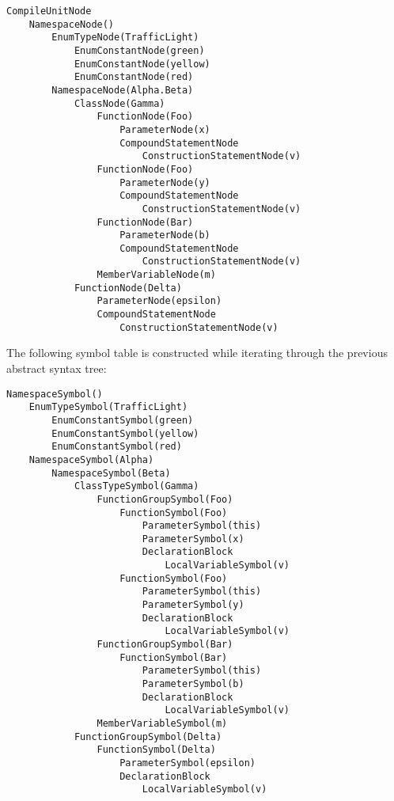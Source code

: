 \documentclass[a4paper,oneside,11pt]{book}
\theoremstyle{definition}
\begin{document}
\begin{verbatim}
CompileUnitNode
    NamespaceNode()
        EnumTypeNode(TrafficLight)
            EnumConstantNode(green)
            EnumConstantNode(yellow)
            EnumConstantNode(red)
        NamespaceNode(Alpha.Beta)
            ClassNode(Gamma)
                FunctionNode(Foo)
                    ParameterNode(x)
                    CompoundStatementNode
                        ConstructionStatementNode(v)
                FunctionNode(Foo)
                    ParameterNode(y)
                    CompoundStatementNode
                        ConstructionStatementNode(v)
                FunctionNode(Bar)
                    ParameterNode(b)
                    CompoundStatementNode
                        ConstructionStatementNode(v)
                MemberVariableNode(m)
            FunctionNode(Delta)
                ParameterNode(epsilon)
                CompoundStatementNode
                    ConstructionStatementNode(v)
\end{verbatim}

\clearpage
The following symbol table is constructed while iterating through the previous abstract syntax tree:

\begin{verbatim}
NamespaceSymbol()
    EnumTypeSymbol(TrafficLight)
        EnumConstantSymbol(green)
        EnumConstantSymbol(yellow)
        EnumConstantSymbol(red)
    NamespaceSymbol(Alpha)
        NamespaceSymbol(Beta)
            ClassTypeSymbol(Gamma)
                FunctionGroupSymbol(Foo)
                    FunctionSymbol(Foo)
                        ParameterSymbol(this)
                        ParameterSymbol(x)
                        DeclarationBlock
                            LocalVariableSymbol(v)
                    FunctionSymbol(Foo)
                        ParameterSymbol(this)
                        ParameterSymbol(y)
                        DeclarationBlock
                            LocalVariableSymbol(v)
                FunctionGroupSymbol(Bar)
                    FunctionSymbol(Bar)
                        ParameterSymbol(this)
                        ParameterSymbol(b)
                        DeclarationBlock
                            LocalVariableSymbol(v)
                MemberVariableSymbol(m)
            FunctionGroupSymbol(Delta)
                FunctionSymbol(Delta)
                    ParameterSymbol(epsilon)
                    DeclarationBlock
                        LocalVariableSymbol(v)
\end{verbatim}
\end{document}
